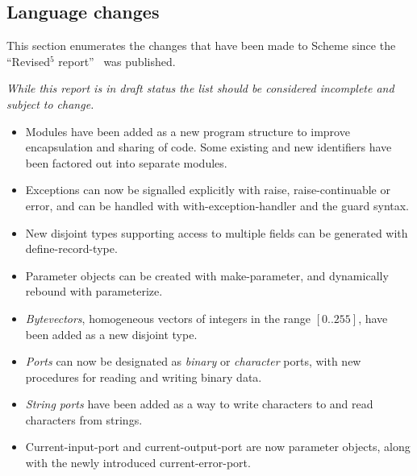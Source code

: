 


\subsection*{Language changes}
\label{differences}

This section enumerates the changes that have been made to Scheme since
the ``Revised$^5$ report''~\cite{R5RS} was published.

{\em While this report is in draft status the list should be considered incomplete and subject to change.}

\begin{itemize}

\item Modules have been added as a new program structure to improve
encapsulation and sharing of code.  Some existing and new identifiers
have been factored out into separate modules.

\item Exceptions can now be signalled explicitly with {\cf raise},
{\cf raise-continuable} or {\cf error}, and can be handled with {\cf
with-exception-handler} and the {\cf guard} syntax.

\item New disjoint types supporting access to multiple fields can be
generated with {\cf define-record-type}.

\item Parameter objects can be created with {\cf make-parameter}, and
dynamically rebound with {\cf parameterize}.

\item {\em Bytevectors}, homogeneous vectors of integers in the range
$[0..255]$, have been added as a new disjoint type.

\item {\em Ports} can now be designated as {\em binary} or {\em
character} ports, with new procedures for reading and writing binary
data.

\item {\em String ports} have been added as a way to write characters
to and read characters from strings.

\item {\cf Current-input-port} and {\cf current-output-port} are now
parameter objects, along with the newly introduced {\cf
current-error-port}.


\end{itemize}
